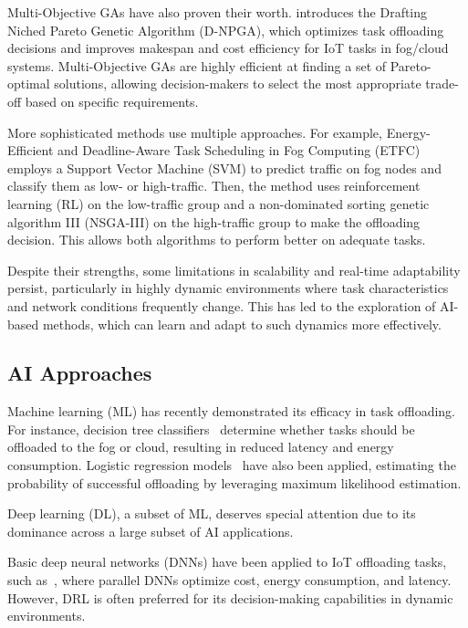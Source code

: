 \documentclass{svproc}
\begin{document}
Multi-Objective GAs have also proven their worth. \cite{bernard_d-npga_2024} introduces the Drafting Niched Pareto Genetic Algorithm (D-NPGA), which optimizes task offloading decisions and improves makespan and cost efficiency for IoT tasks in fog/cloud systems. Multi-Objective GAs are highly efficient at finding a set of Pareto-optimal solutions, allowing decision-makers to select the most appropriate trade-off based on specific requirements.

More sophisticated methods use multiple approaches. For example, Energy-Efficient and Deadline-Aware Task Scheduling in Fog Computing (ETFC)~\cite{pakmehr_etfc_2024} employs a Support Vector Machine (SVM) to predict traffic on fog nodes and classify them as low- or high-traffic. Then, the method uses reinforcement learning (RL) on the low-traffic group and a non-dominated sorting genetic algorithm III (NSGA-III) on the high-traffic group to make the offloading decision. This allows both algorithms to perform better on adequate tasks.

Despite their strengths, some limitations in scalability and real-time adaptability persist, particularly in highly dynamic environments where task characteristics and network conditions frequently change. This has led to the exploration of AI-based methods, which can learn and adapt to such dynamics more effectively.



\subsection{AI Approaches}

Machine learning (ML) has recently demonstrated its efficacy in task offloading. For instance, decision tree classifiers~\cite{suryadevara_energy_2021} determine whether tasks should be offloaded to the fog or cloud, resulting in reduced latency and energy consumption. Logistic regression models~\cite{bukhari_intelligent_2022} have also been applied, estimating the probability of successful offloading by leveraging maximum likelihood estimation.

Deep learning (DL), a subset of ML, deserves special attention due to its dominance across a large subset of AI applications. 

Basic deep neural networks (DNNs) have been applied to IoT offloading tasks, such as~\cite{sarkar_deep_2022}, where parallel DNNs optimize cost, energy consumption, and latency. However, DRL is often preferred for its decision-making capabilities in dynamic environments.
\end{document}
